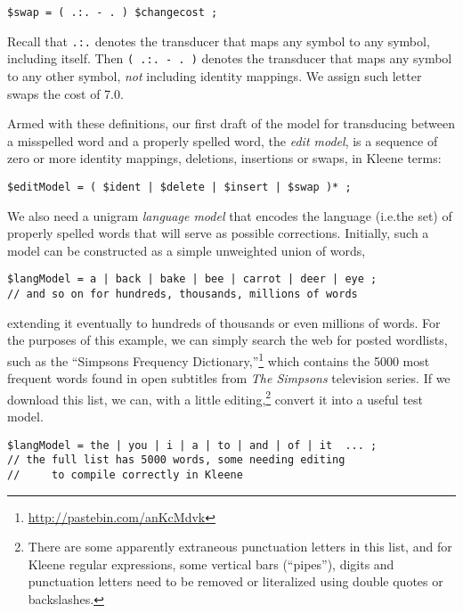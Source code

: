 \begin{Verbatim}
$swap = ( .:. - . ) $changecost ;
\end{Verbatim}

\noindent
Recall that \texttt{.:.} denotes the transducer that maps any symbol to any
symbol, including itself.  Then \texttt{(~.:.~- .~)} denotes the transducer
that maps any symbol to any other symbol, \emph{not} including identity mappings.  We
assign such letter swaps the cost of 7.0.

Armed with these definitions, our first draft of the model for transducing between a 
misspelled word and a properly spelled word, the \emph{edit model}, is a
sequence of zero or more identity mappings, deletions, insertions or swaps,
in Kleene terms:

\begin{Verbatim}
$editModel = ( $ident | $delete | $insert | $swap )* ;
\end{Verbatim}

We also need a unigram \emph{language model} that encodes the language (i.e.\@ the
set) of properly spelled words that will serve as possible corrections.  
Initially, such a model can be constructed
as a simple unweighted union of words,

\begin{Verbatim}
$langModel = a | back | bake | bee | carrot | deer | eye ;
// and so on for hundreds, thousands, millions of words
\end{Verbatim}

\noindent
extending it eventually to hundreds of thousands or even millions of words.  For the purposes
of this example, we can simply search the web for posted wordlists, such as the
``Simpsons Frequency Dictionary,''\footnote{\url{http://pastebin.com/anKcMdvk}} which contains the 5000 most frequent words
found in open subtitles from \emph{The Simpsons} television series.  If we download this list, we can, with a
little editing,\footnote{There are some apparently extraneous punctuation letters
	in this list, and for Kleene regular expressions, some vertical bars (``pipes''), digits and punctuation
letters need to be removed or literalized using double quotes or backslashes.} convert it into a useful test model.

\begin{Verbatim}
$langModel = the | you | i | a | to | and | of | it  ... ;
// the full list has 5000 words, some needing editing 
//     to compile correctly in Kleene
\end{Verbatim}

